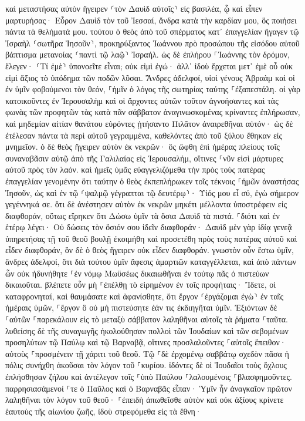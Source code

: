\documentclass[twoside, 9pt]{extreport}
\begin{document}
καὶ μεταστήσας αὐτὸν ἤγειρεν ⸂τὸν Δαυὶδ αὐτοῖς⸃ εἰς βασιλέα, ᾧ καὶ εἶπεν μαρτυρήσας· Εὗρον Δαυὶδ τὸν τοῦ Ἰεσσαί, ἄνδρα κατὰ τὴν καρδίαν μου, ὃς ποιήσει πάντα τὰ θελήματά μου. 
τούτου ὁ θεὸς ἀπὸ τοῦ σπέρματος κατ᾽ ἐπαγγελίαν ἤγαγεν τῷ Ἰσραὴλ ⸂σωτῆρα Ἰησοῦν⸃, 
προκηρύξαντος Ἰωάννου πρὸ προσώπου τῆς εἰσόδου αὐτοῦ βάπτισμα μετανοίας ⸂παντὶ τῷ λαῷ⸃ Ἰσραήλ. 
ὡς δὲ ἐπλήρου ⸀Ἰωάννης τὸν δρόμον, ἔλεγεν· ⸂Τί ἐμὲ⸃ ὑπονοεῖτε εἶναι; οὐκ εἰμὶ ἐγώ· ἀλλ᾽ ἰδοὺ ἔρχεται μετ᾽ ἐμὲ οὗ οὐκ εἰμὶ ἄξιος τὸ ὑπόδημα τῶν ποδῶν λῦσαι. 
Ἄνδρες ἀδελφοί, υἱοὶ γένους Ἀβραὰμ καὶ οἱ ἐν ὑμῖν φοβούμενοι τὸν θεόν, ⸀ἡμῖν ὁ λόγος τῆς σωτηρίας ταύτης ⸀ἐξαπεστάλη. 
οἱ γὰρ κατοικοῦντες ἐν Ἰερουσαλὴμ καὶ οἱ ἄρχοντες αὐτῶν τοῦτον ἀγνοήσαντες καὶ τὰς φωνὰς τῶν προφητῶν τὰς κατὰ πᾶν σάββατον ἀναγινωσκομένας κρίναντες ἐπλήρωσαν, 
καὶ μηδεμίαν αἰτίαν θανάτου εὑρόντες ᾐτήσαντο Πιλᾶτον ἀναιρεθῆναι αὐτόν· 
ὡς δὲ ἐτέλεσαν πάντα τὰ περὶ αὐτοῦ γεγραμμένα, καθελόντες ἀπὸ τοῦ ξύλου ἔθηκαν εἰς μνημεῖον. 
ὁ δὲ θεὸς ἤγειρεν αὐτὸν ἐκ νεκρῶν· 
ὃς ὤφθη ἐπὶ ἡμέρας πλείους τοῖς συναναβᾶσιν αὐτῷ ἀπὸ τῆς Γαλιλαίας εἰς Ἰερουσαλήμ, οἵτινες ⸀νῦν εἰσὶ μάρτυρες αὐτοῦ πρὸς τὸν λαόν. 
καὶ ἡμεῖς ὑμᾶς εὐαγγελιζόμεθα τὴν πρὸς τοὺς πατέρας ἐπαγγελίαν γενομένην 
ὅτι ταύτην ὁ θεὸς ἐκπεπλήρωκεν τοῖς τέκνοις ⸀ἡμῶν ἀναστήσας Ἰησοῦν, ὡς καὶ ἐν τῷ ⸂ψαλμῷ γέγραπται τῷ δευτέρῳ⸃· Υἱός μου εἶ σύ, ἐγὼ σήμερον γεγέννηκά σε. 
ὅτι δὲ ἀνέστησεν αὐτὸν ἐκ νεκρῶν μηκέτι μέλλοντα ὑποστρέφειν εἰς διαφθοράν, οὕτως εἴρηκεν ὅτι Δώσω ὑμῖν τὰ ὅσια Δαυὶδ τὰ πιστά. 
⸀διότι καὶ ἐν ἑτέρῳ λέγει· Οὐ δώσεις τὸν ὅσιόν σου ἰδεῖν διαφθοράν· 
Δαυὶδ μὲν γὰρ ἰδίᾳ γενεᾷ ὑπηρετήσας τῇ τοῦ θεοῦ βουλῇ ἐκοιμήθη καὶ προσετέθη πρὸς τοὺς πατέρας αὐτοῦ καὶ εἶδεν διαφθοράν, 
ὃν δὲ ὁ θεὸς ἤγειρεν οὐκ εἶδεν διαφθοράν. 
γνωστὸν οὖν ἔστω ὑμῖν, ἄνδρες ἀδελφοί, ὅτι διὰ τούτου ὑμῖν ἄφεσις ἁμαρτιῶν καταγγέλλεται, καὶ ἀπὸ πάντων ὧν οὐκ ἠδυνήθητε ⸀ἐν νόμῳ Μωϋσέως δικαιωθῆναι 
ἐν τούτῳ πᾶς ὁ πιστεύων δικαιοῦται. 
βλέπετε οὖν μὴ ⸀ἐπέλθῃ τὸ εἰρημένον ἐν τοῖς προφήταις· 
Ἴδετε, οἱ καταφρονηταί, καὶ θαυμάσατε καὶ ἀφανίσθητε, ὅτι ἔργον ⸂ἐργάζομαι ἐγὼ⸃ ἐν ταῖς ἡμέραις ὑμῶν, ⸀ἔργον ὃ οὐ μὴ πιστεύσητε ἐάν τις ἐκδιηγῆται ὑμῖν. 
Ἐξιόντων δὲ ⸀αὐτῶν ⸀παρεκάλουν εἰς τὸ μεταξὺ σάββατον λαληθῆναι αὐτοῖς τὰ ῥήματα ⸀ταῦτα. 
λυθείσης δὲ τῆς συναγωγῆς ἠκολούθησαν πολλοὶ τῶν Ἰουδαίων καὶ τῶν σεβομένων προσηλύτων τῷ Παύλῳ καὶ τῷ Βαρναβᾷ, οἵτινες προσλαλοῦντες ⸀αὐτοῖς ἔπειθον· αὐτοὺς ⸀προσμένειν τῇ χάριτι τοῦ θεοῦ. 
Τῷ ⸀δὲ ἐρχομένῳ σαββάτῳ σχεδὸν πᾶσα ἡ πόλις συνήχθη ἀκοῦσαι τὸν λόγον τοῦ ⸀κυρίου. 
ἰδόντες δὲ οἱ Ἰουδαῖοι τοὺς ὄχλους ἐπλήσθησαν ζήλου καὶ ἀντέλεγον τοῖς ⸀ὑπὸ Παύλου ⸀λαλουμένοις ⸀βλασφημοῦντες. 
παρρησιασάμενοί ⸀τε ὁ Παῦλος καὶ ὁ Βαρναβᾶς εἶπαν· Ὑμῖν ἦν ἀναγκαῖον πρῶτον λαληθῆναι τὸν λόγον τοῦ θεοῦ· ⸀ἐπειδὴ ἀπωθεῖσθε αὐτὸν καὶ οὐκ ἀξίους κρίνετε ἑαυτοὺς τῆς αἰωνίου ζωῆς, ἰδοὺ στρεφόμεθα εἰς τὰ ἔθνη· 
\end{document}
